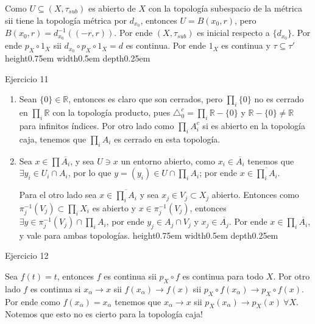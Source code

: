 \documentclass[11pt]{article}
\newcommand{\R}{{\mathbb{R}}}
\newcommand{\sett}[1]{\{#1\}}
\newenvironment{proof}[1][Demostraci\'on]{\begin{trivlist}
\item[\hskip \labelsep {\bfseries #1}]}{\end{trivlist}}
\newcommand{\qed}{\nobreak \ifvmode \relax \else
      \ifdim\lastskip<1.5em \hskip-\lastskip
      \hskip1.5em plus0em minus0.5em \fi \nobreak
      \vrule height0.75em width0.5em depth0.25em\fi}
\begin{document}
\begin{enumerate}
\begin{proof}
\begin{enumerate}
Como $U \subseteq (X, \tau_{sub})$ es abierto de $X$ con la topolog\'ia subespacio de la m\'etrica sii tiene la topolog\'ia m\'etrica por $d_{x_0}$, entonces $U = B(x_0,r)$, pero $B(x_0,r) = d_{x_0}^{-1}((-r,r))$. Por ende $(X,\tau_{sub})$ es inicial respecto a $\sett{d_{x_0}}$. Por ende $p_X \circ 1_X$ sii $d_{x_0} \circ p_X \circ 1_X = d$ es continua. Por ende $1_X$ es continua y $\tau \subseteq \tau'$ \qed

\end{enumerate}

\end{proof}

\item {Ejercicio 11}

\begin{proof}

\begin{enumerate}

\item Sean $\sett{0} \in \R$, entonces es claro que son cerrados, pero $\prod_{i}{\sett{0}}$ no es cerrado en $\prod_{i}{\R}$ con la topolog\'ia producto, pues $\triangle_{0}^{c} = \prod_{i}{\R - \sett{0}}$ y $\R - \sett{0} \neq \R$ para infinitos \'indices. Por otro lado como $\prod_{i}{A_{i}^{c}}$ si es abierto en la topolog\'ia caja, tenemos que $\prod_{i}{A_i}$ es cerrado en esta topolog\'ia.

\item Sea $x \in \prod{\overline{A_i}}$, y sea $U \ni x$ un entorno abierto, como $x_{i} \in \overline{A_i}$ tenemos que $\exists y_i \in U_i \cap A_i$, por lo que $y = (y_i) \in U \cap \prod_{i}{A_i}$; por ende $x \in \overline{\prod_{i}{A_i}}$. 

Para el otro lado sea $x \in \overline{\prod_{i}{A_i}}$ y sea $x_j \in V_j \subset X_j$ abierto. Entonces como $\pi_{j}^{-1}(V_j) \subset \prod_{i}{X_i}$ es abierto y $x \in \pi_{j}^{-1}(V_j)$, entonces $\exists y \in \pi_{j}^{-1}(V_j) \cap \prod_{i}{A_i}$, por ende $y_j \in A_j \cap V_j$ y $x_j \in \overline{A_j}$. Por ende $x \in \prod_{i}{\overline{A_i}}$, y vale para ambas topolog\'ias. \qed

\end{enumerate}

\end{proof}

\item {Ejercicio 12}

\begin{proof}

Sea $f(t) = t$, entonces $f$ es continua sii $p_X \circ f $ es continua para todo $X$. Por otro lado $f$ es continua si $x_{\alpha} \rightarrow x$ sii $f(x_{\alpha}) \rightarrow f(x)$ sii $p_X \circ f (x_{\alpha}) \rightarrow p_X \circ f(x)$. Por ende como $f(x_{\alpha}) = x_{\alpha}$ tenemos que $x_{\alpha} \rightarrow x$ sii $p_X(x_{\alpha}) \rightarrow p_X(x) \ \forall X$. Notemos que esto no es cierto para la topolog\'ia caja!


\end{proof}
\end{enumerate}
\end{document}
